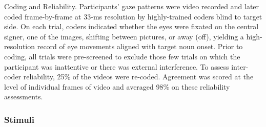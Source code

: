 \documentclass[oneside]{report}
\begin{document}
Coding and Reliability. Participants' gaze patterns were video recorded
and later coded frame-by-frame at 33-ms resolution by highly-trained
coders blind to target side. On each trial, coders indicated whether the
eyes were fixated on the central signer, one of the images, shifting
between pictures, or away (off), yielding a high-resolution record of
eye movements aligned with target noun onset. Prior to coding, all
trials were pre-screened to exclude those few trials on which the
participant was inattentive or there was external interference. To
assess inter-coder reliability, 25\% of the videos were re-coded.
Agreement was scored at the level of individual frames of video and
averaged 98\% on these reliability assessments.

\subsubsection{Stimuli}\label{stimuli}
\end{document}
